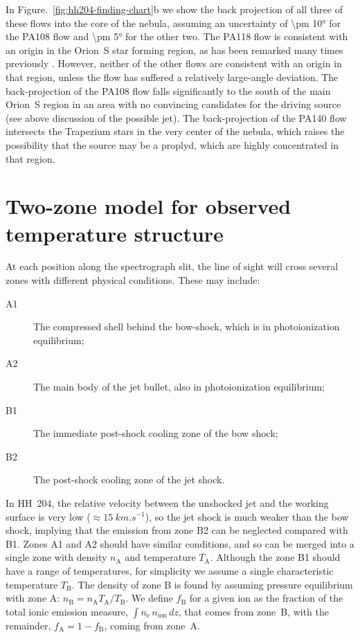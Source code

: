\documentclass[twocolumn]{aastex63}
\begin{document}
In Figure.~\ref{fig:hh204-finding-chart}b we show the back projection of
all three of these flows into the core of the nebula,
assuming an uncertainty of \ang{\pm 10} for the PA108 flow
and \ang{\pm 5} for the other two.
The PA118 flow is consistent with an origin in the Orion~S
star forming region,
as has been remarked many times previously
\citep{ODell:1997a, Rosado:2002e, ODell:2003n}.
However, neither of the other flows are consistent with an origin in that region,
unless the flow has suffered a relatively large-angle deviation.
The back-projection of the PA108 flow falls significantly to the south
of the main Orion~S region
in an area with no convincing candidates for the driving source
(see above discussion of the possible  jet).
The back-projection of the PA140 flow intersects the Trapezium stars
in the very center of the nebula, which raises the possibility that the source
may be a proplyd, which are highly concentrated in that region.


\clearpage

\section{Two-zone model for observed temperature structure}

\newcommand\zA{\ensuremath{_\mathrm{A}}}
\newcommand\zB{\ensuremath{_\mathrm{B}}}

At each position along the spectrograph slit, the line of sight will cross several zones
with different physical conditions.  These may include:
\begin{description}
\item[A1] The compressed shell behind the bow-shock,
  which is in photoionization equilibrium;
\item[A2] The main body of the jet bullet, also in photoionization equilibrium;
\item[B1] The immediate post-shock cooling zone of the bow shock;
\item[B2] The post-shock cooling zone of the jet shock.
\end{description}
In HH~204, the relative velocity between the unshocked jet and the working surface
is very low (\(\approx \SI{15}{km.s^{-1}}\)), so the jet shock is much weaker than the bow shock,
implying that the emission from zone B2 can be neglected compared with B1.
Zones A1 and A2 should have similar conditions, and so can be merged into a single zone with density \(n\zA\) and temperature \(T\zA\).
Although the zone B1 should have a range of temperatures,
for simplicity we assume a single characteristic temperature \(T\zB\).
The density of zone B is found by assuming pressure equilibrium with zone A:
\(n\zB = n\zA T\zA / T\zB\).
We define \(f\zB\) for a given ion as the fraction of the total ionic emission measure,
\(\int n_{\mathrm{e}}\, n_{\mathrm{ion}}\,dz\),
that comes from zone~B,
with the remainder, \(f\zA = 1 - f\zB\), coming from zone~A.
\end{document}
